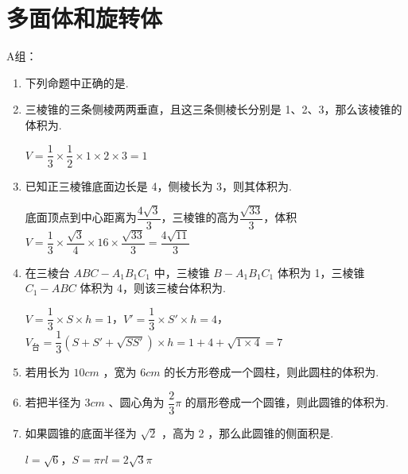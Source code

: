 \section*{多面体和旋转体}
A组：
\begin{enumerate}
    \item 下列命题中正确的是.
    
    \item 三棱锥的三条侧棱两两垂直，且这三条侧棱长分别是 1、2、3，那么该棱锥的体积为.
    \begin{jieda}
        $V = \dfrac{1}{3} \times \dfrac{1}{2} \times 1 \times 2 \times 3 = 1$
    \end{jieda}
    
    \item 已知正三棱锥底面边长是 4，侧棱长为 3，则其体积为.
    \begin{jieda}
        底面顶点到中心距离为$\dfrac{4\sqrt{3}}{3}$，三棱锥的高为$\dfrac{\sqrt{33}}{3}$，体积$V = \dfrac{1}{3} \times \dfrac{\sqrt{3}}{4} \times 16 \times \dfrac{\sqrt{33}}{3} = \dfrac{4\sqrt{11}}{3}$
    \end{jieda}
    
    \item 在三棱台 ${ABC} - {A}_{1}{B}_{1}{C}_{1}$ 中，三棱锥 $B - {A}_{1}{B}_{1}{C}_{1}$ 体积为 1，三棱锥 ${C}_{1} - {ABC}$ 体积为 4，则该三棱台体积为.
    \begin{jieda}
        $V = \dfrac{1}{3} \times S \times h = 1$，$V' = \dfrac{1}{3} \times S' \times h = 4$， $V_{\text{台}} = \dfrac{1}{3}(S+S'+\sqrt{SS'}) \times h = 1+4+\sqrt{1\times4} = 7$
    \end{jieda}
    
    \item 若用长为 ${10}{{cm}}$ ，宽为 $6{{cm}}$ 的长方形卷成一个圆柱，则此圆柱的体积为.
    
    \item 若把半径为 $3{{cm}}$ 、圆心角为 $\dfrac{2}{3}\pi$ 的扇形卷成一个圆锥，则此圆锥的体积为.
    
    \item 如果圆锥的底面半径为 $\sqrt{2}$ ，高为 2 ，那么此圆锥的侧面积是.
    \begin{jieda}
        $l = \sqrt{6}$，$S = \pi rl = 2\sqrt{3}\pi$
    \end{jieda}

\end{enumerate}
